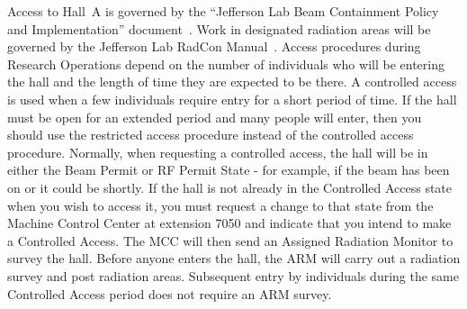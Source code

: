 {Access to Hall~A is governed by the ``Jefferson Lab Beam Containment
Policy and Implementation'' document~\cite{EHScebaf6310T2}.
Work in
designated radiation areas will be governed by the Jefferson Lab
RadCon Manual~\cite{RADCONcebaf}.  Access procedures during 
Research Operations depend on
the number of individuals who will be entering the hall and the length
of time they are expected to be there.  A controlled access is used
when a few individuals require entry for a short period of time. If
the hall must be open for an extended period and many people will
enter, then you should use the restricted access procedure instead of
the controlled access procedure.  Normally, when requesting a
controlled access, the hall will be in either the Beam Permit or RF
Permit State - for example, if the beam has been on or it could be
shortly.  If the hall is not already in the Controlled Access state
when you wish to access it, you must request a change to that state
from the Machine Control Center at extension 7050 and indicate that
you intend to make a Controlled Access. The MCC will then send an
Assigned Radiation Monitor to survey the hall. Before anyone enters
the hall, the ARM will carry out a radiation survey and post radiation
areas. Subsequent entry by individuals during the same Controlled
Access period does not require an ARM survey.
}

